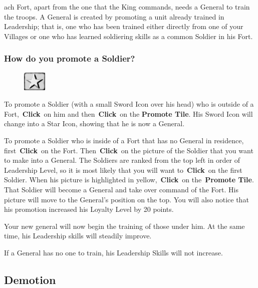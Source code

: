 ach Fort, apart from the one that the King commands, needs a General to train the troops. A General is created by promoting a unit already trained in Leadership; that is, one who has been trained either directly from one of your Villages or one who has learned soldiering skills as a common Soldier in his Fort.

\subsubsection{How do you promote a Soldier?}

\begin{figure}
	\vspace{-20pt}
	\begin{center}
		\includegraphics[width=0.1\textwidth]{Tstar}
	\end{center}
	\vspace{-20pt}
\end{figure}

To promote a Soldier (with a small Sword Icon over his head) who is outside of a Fort, \textbf{Click} on him and then \textbf{Click} on the \textbf{Promote Tile}. His Sword Icon will change into a Star Icon, showing that he is now a General.

To promote a Soldier who is inside of a Fort that has no General in residence, first \textbf{Click} on the Fort. Then \textbf{Click} on the picture of the Soldier that you want to make into a General. The Soldiers are ranked from the top left in order of Leadership Level, so it is most likely that you will want to \textbf{Click} on the first Soldier. When his picture is highlighted in yellow, \textbf{Click} on the \textbf{Promote Tile}. That Soldier will become a General and take over command of the Fort. His picture will move to the General’s position on the top. You will also notice that his promotion increased his Loyalty Level by 20 points.

Your new general will now begin the training of those under him. At the same time, his Leadership skills will steadily improve.

If a General has no one to train, his Leadership Skills will not increase.

\subsection{Demotion}

